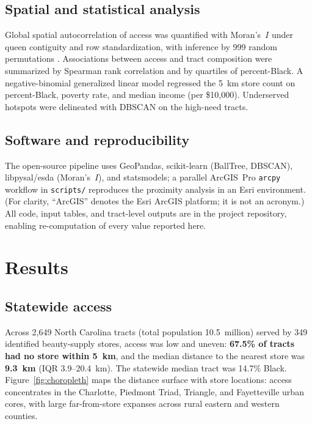 \documentclass[12pt,letterpaper]{article}
\begin{document}
\subsection{Spatial and statistical analysis}

Global spatial autocorrelation of access was quantified with Moran's~$I$ under
queen contiguity and row standardization, with inference by 999 random
permutations \citep{moran1950,anselin1995}. Associations between access and
tract composition were summarized by Spearman rank correlation and by
quartiles of percent-Black. A negative-binomial generalized linear model
regressed the 5~km store count on percent-Black, poverty rate, and median
income (per \$10{,}000). Underserved hotspots were delineated with DBSCAN on
the high-need tracts.

\subsection{Software and reproducibility}

The open-source pipeline uses GeoPandas, scikit-learn (BallTree, DBSCAN),
libpysal/esda (Moran's~$I$), and statsmodels; a parallel ArcGIS~Pro
\texttt{arcpy} workflow
in \texttt{scripts/} reproduces the proximity analysis in an Esri environment. (For clarity,
``ArcGIS'' denotes the Esri ArcGIS platform; it is not an acronym.) All code,
input tables, and tract-level outputs are in the project repository, enabling
re-computation of every value reported here.

\section{Results}
\label{sec:results}

\subsection{Statewide access}

Across 2{,}649 North Carolina tracts (total population 10.5~million) served by
349 identified beauty-supply stores, access was low and uneven: \textbf{67.5\%
of tracts had no store within 5~km}, and the median distance to the nearest
store was \textbf{9.3~km} (IQR 3.9--20.4~km). The statewide median tract was
14.7\% Black. Figure~\ref{fig:choropleth} maps the distance surface with store
locations: access concentrates in the Charlotte, Piedmont Triad, Triangle, and
Fayetteville urban cores, with large far-from-store expanses across rural
eastern and western counties.
\end{document}
